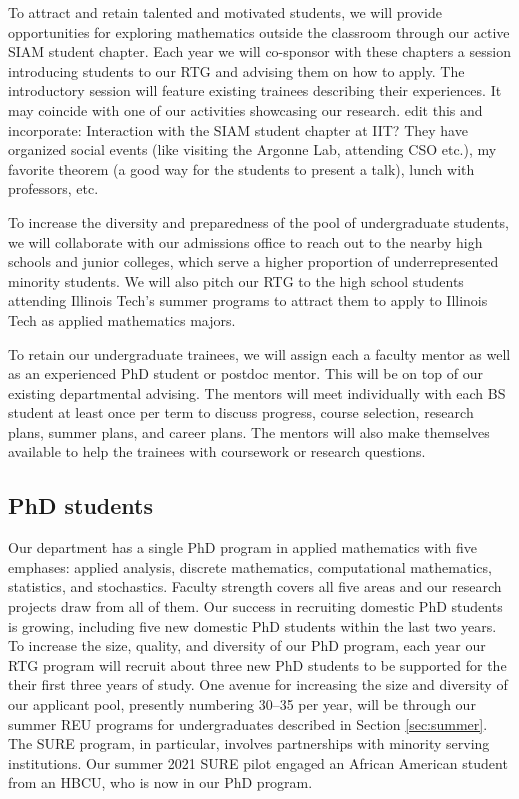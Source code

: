 \documentclass[11pt]{NSFamsart}
\begin{document}
To attract and retain talented and motivated students, we will provide opportunities for exploring mathematics outside the classroom through our active  SIAM student chapter.  Each year we will co-sponsor with these chapters a session introducing students to our RTG and advising them on how to apply.  The introductory session will feature existing trainees describing their experiences. It may coincide with one of our activities showcasing our research. {\color{red}edit this and incorporate:} Interaction with the SIAM student chapter at IIT?  They have organized social events (like visiting the Argonne Lab, attending CSO etc.), my favorite theorem (a good way for the students to present a talk), lunch with professors, etc.

To increase the diversity and preparedness of the pool of undergraduate students, we will collaborate with our admissions office to reach out to the nearby high schools and junior colleges, which serve a higher proportion of underrepresented minority students.  We will also pitch our RTG to the high school students attending Illinois Tech's summer programs to attract them to apply to Illinois Tech as applied mathematics majors.

To retain our undergraduate trainees, we will assign each a faculty mentor as well as an experienced PhD student or postdoc mentor.  This will be on top of our existing departmental advising.  The mentors will meet individually with each BS student at least once per term to discuss progress, course selection, research plans, summer plans, and career plans.  The mentors will also make themselves available to help the trainees with coursework or research questions. %

\subsection*{PhD students} 
Our department has a single PhD program in applied mathematics with five emphases: applied analysis, discrete mathematics, computational mathematics, statistics, and stochastics.  Faculty strength covers all five areas and our research projects draw from all of them. Our success in recruiting domestic PhD students is growing, including five new domestic PhD students within the last two years. 
To increase the size, quality, and diversity of our PhD program, each year our RTG program will recruit about three new PhD students to be supported for the their first three years of study.  One avenue for increasing the size and diversity of our applicant pool, presently numbering 30--35 per year, will be through our summer REU programs for undergraduates described in Section \ref{sec:summer}.  The SURE program, in particular, involves partnerships with minority serving institutions.  Our summer 2021 SURE pilot engaged an African American student from an HBCU, who is now in our PhD program.  
\end{document}
